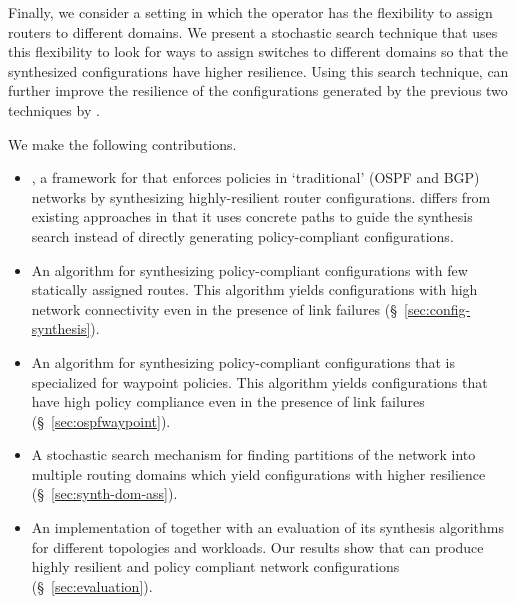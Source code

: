 Finally, we consider a setting in which the operator has the
flexibility to assign routers to different domains.  We present a
stochastic search technique that uses this flexibility to look for
ways to assign switches to different domains so that the synthesized
configurations have higher resilience.  Using this search technique,
\name can further improve the resilience of the configurations
generated by the previous two techniques by .




 We make the following contributions.
\begin{itemize}	
    \item \name, a framework for
	that enforces policies in `traditional' (OSPF and BGP) networks
	by synthesizing highly-resilient router configurations. 		
	\name differs from existing approaches in that it uses concrete
	paths to guide the synthesis search instead of directly generating policy-compliant
	configurations.

	\item An algorithm for synthesizing policy-compliant
          configurations with few statically assigned routes. This
          algorithm yields configurations with high network
          connectivity even in the presence of link failures
          (\S~\ref{sec:config-synthesis}).

	\item An algorithm for synthesizing policy-compliant 		
		 configurations that is specialized for waypoint policies. 
		 This algorithm yields configurations that have
		 high policy compliance even in the presence of link failures (\S~\ref{sec:ospfwaypoint}). 
	
	\item A stochastic search mechanism for finding 
		partitions of the network into multiple routing domains which
		yield configurations with higher resilience (\S~\ref{sec:synth-dom-ass}).
	
	\item An implementation of \name
	together with an evaluation of its synthesis algorithms
	 for different topologies and workloads. 
	 Our results show that \name can produce highly resilient and policy compliant
	 network configurations (\S~\ref{sec:evaluation}). 
\end{itemize}
